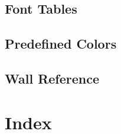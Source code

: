 \documentclass{book}
\begin{document}

\cleardoublepage



















\section{Font Tables}



\newpage

\section{Predefined Colors}

\label{colors:sec}
\mbox{}
\newpage

\label{sortedcol:sec}
\mbox{}
\newpage

\section{Wall Reference}

\label{wallref:sec}

\chapter{Index}
\printindex
\end{document}
